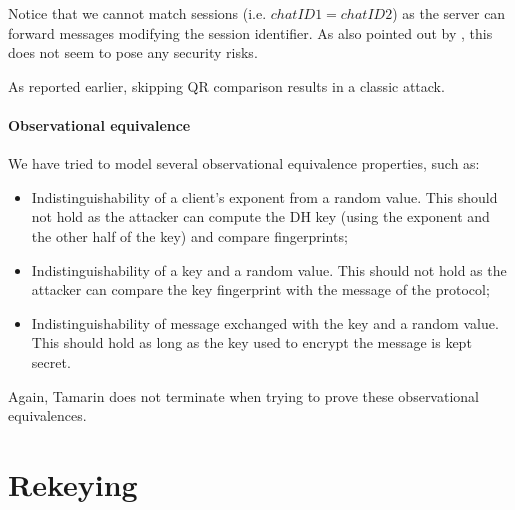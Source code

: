 Notice that we cannot match sessions (i.e. $chatID1 = chatID2$) as the server can forward messages modifying the session identifier. As also pointed out by \MMNV{} \cite{MTProto2-Proverif}, this does not seem to pose any security risks.

As reported earlier, skipping QR comparison results in a classic \DiHe{} \mitm{} attack.

\paragraph{Observational equivalence} We have tried to model several observational equivalence properties, such as:
\begin{itemize}
  \item Indistinguishability of a client's exponent from a random value. This should not hold as the attacker can compute the DH key (using the exponent and the other half of the key) and compare fingerprints;
  \item Indistinguishability of a \schat{} key and a random value. This should not hold as the attacker can compare the key fingerprint with the  message of the protocol;
  \item Indistinguishability of message exchanged with the \schat{} key and a random value. This should hold as long as the key used to encrypt the message is kept secret.
\end{itemize}

Again, Tamarin does not terminate when trying to prove these observational equivalences.



\newpage
\section{Rekeying}

